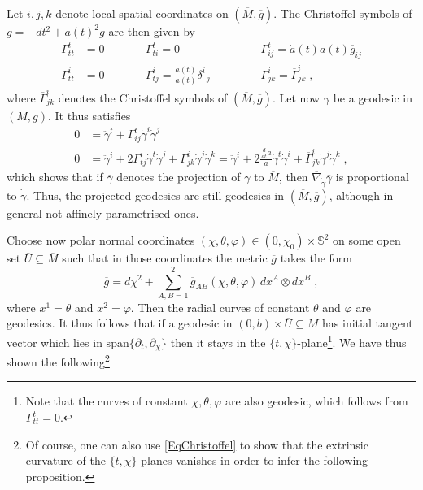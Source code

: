 \documentclass[reqno]{article}
\begin{document}
Let $i,j,k$ denote local spatial coordinates on $(\overline{M},\overline{g})$. The Christoffel symbols of $g = -dt^2 + a(t)^2 \overline{g}$ are then given by
\begin{equation}\label{EqChristoffel}
\begin{aligned}
\Gamma^t_{tt} &= 0 \qquad  &&\Gamma^t_{ti} =0 \qquad  &&&\Gamma^t_{ij} = \dot{a}(t) a(t) \overline{g}_{ij} \\
\Gamma^i_{tt} &= 0 \qquad  &&\Gamma^i_{tj} = \frac{\dot{a}(t)}{a(t)} \delta^i_{\; \; j} \qquad  &&&\Gamma^i_{jk} = \overline{\Gamma}^i_{jk} \;,
\end{aligned}
\end{equation}
where $\overline{\Gamma}^i_{jk}$ denotes the Christoffel symbols of $(\overline{M}, \overline{g})$.
Let now $\gamma$ be a geodesic in $(M,g)$. It thus satisfies
\begin{align*} 
0&=\ddot{\gamma}^t + \Gamma^t_{ij} \dot{\gamma}^i \dot{\gamma}^j \\
0&= \ddot{\gamma}^i + 2\Gamma^i_{tj} \dot{\gamma}^t \dot{\gamma}^j + \Gamma^i_{jk} \dot{\gamma}^j \dot{\gamma}^k = \ddot{\gamma}^i + 2 \frac{\frac{d}{dt}a}{a} \dot{\gamma}^t \dot{\gamma}^i + \overline{\Gamma}^i_{jk} \dot{\gamma}^j \dot{\gamma}^k \;,
\end{align*}
which shows that if $\overline{\gamma}$ denotes the projection of $\gamma$ to $\overline{M}$, then $\overline{\nabla}_{\dot{\overline{\gamma}}} \dot{\overline{\gamma}} $ is proportional to $\dot{\overline{\gamma}}$. Thus, the projected geodesics are still geodesics in $(\overline{M}, \overline{g})$, although in general not affinely parametrised ones. 

Choose now polar normal coordinates $(\chi, \theta, \varphi) \in (0,\chi_0) \times \mathbb{S}^2$ on some open set $\overline{U} \subseteq \overline{M}$ such that in those coordinates the metric $\overline{g}$ takes the form 
\begin{equation}\label{EqMetricPolarNC}
\overline{g} = d \chi^2 + \sum_{A,B = 1}^2\overline{g}_{AB}(\chi, \theta, \varphi) \,dx^A \otimes dx^B\;,
\end{equation} 
where $x^1 = \theta$ and $x^2=\varphi$. Then the radial curves of constant $\theta$ and $\varphi$ are geodesics. It thus follows that if a geodesic in $(0,b) \times \overline{U} \subseteq M$ has initial tangent vector which lies in $\mathrm{span} \{\partial_t, \partial_\chi\}$ then it stays in the $\{t, \chi\}$-plane\footnote{Note that the curves of constant $\chi, \theta, \varphi$ are also geodesic, which follows from $\Gamma^t_{tt} = 0$.}. We have thus shown the following\footnote{Of course, one can also use \eqref{EqChristoffel} to show that the extrinsic curvature of the $\{t, \chi\}$-planes vanishes in order to infer the following proposition.}
\end{document}
